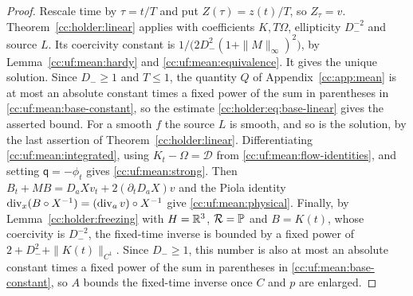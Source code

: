 \begin{proof}
Rescale time by $\tau=t/T$ and put $Z(\tau)=z(t)/T$, so
$Z_\tau=v$. Theorem~\ref{cc:holder:linear} applies with coefficients
$K,T\Omega$, ellipticity $D_-^{-2}$ and source $L$.
Its coercivity constant is $1/\bigl(2D_-^2(1+\|M\|_\infty)^2\bigr)$,
by Lemma~\ref{cc:uf:mean:hardy} and \eqref{cc:uf:mean:equivalence}.
It gives the unique solution. Since $D_-\ge1$ and $T\le1$, the quantity
$Q$ of Appendix~\ref{cc:app:mean} is at most an absolute constant times
a fixed power of the sum in parentheses in
\eqref{cc:uf:mean:base-constant}, so the estimate
\eqref{cc:holder:eq:base-linear} gives the asserted bound.
For a smooth $f$ the source $L$ is smooth, and so is the solution, by
the last assertion of Theorem~\ref{cc:holder:linear}.
Differentiating \eqref{cc:uf:mean:integrated}, using
$K_t-\Omega=\mathcal D$ from \eqref{cc:uf:mean:flow-identities}, and
setting $\mathsf q=-\phi_t$ gives
\eqref{cc:uf:mean:strong}. Then
$B_t+MB=D_aX v_t+2(\partial_t D_aX)v$ and the Piola identity
$\operatorname{div}_x(B\circ X^{-1})=(\operatorname{div}_a v)\circ X^{-1}$ give
\eqref{cc:uf:mean:physical}.
Finally, by Lemma~\ref{cc:holder:freezing} with $H=\mathbb R^3$, $\mathcal R=\mathbb P$ and
$B=K(t)$, whose coercivity is $D_-^{-2}$, the fixed-time inverse is
bounded by a fixed power of $2+D_-^2+\|K(t)\|_{C^1}$. Since
$D_-\ge1$, this number is also at most an absolute constant times a
fixed power of the sum in parentheses in
\eqref{cc:uf:mean:base-constant}, so $A$ bounds the fixed-time inverse
once $C$ and $p$ are enlarged.
\end{proof}
